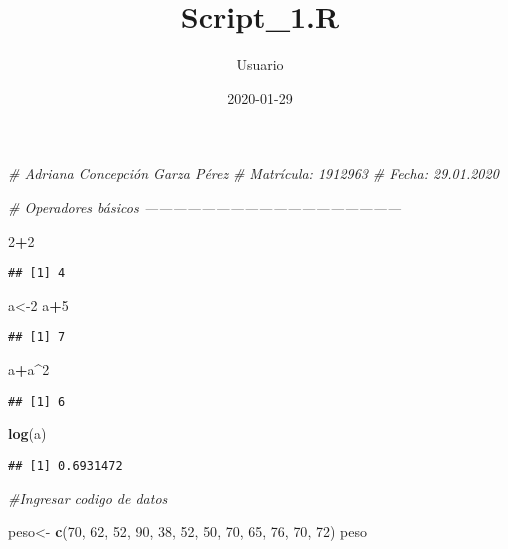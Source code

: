 \documentclass[
]{article}
\title{Script\_1.R}
\author{Usuario}
\date{2020-01-29}
\newenvironment{Shaded}{\begin{snugshade}}{\end{snugshade}}
\newcommand{\CommentTok}[1]{\textcolor[rgb]{0.56,0.35,0.01}{\textit{#1}}}
\newcommand{\DecValTok}[1]{\textcolor[rgb]{0.00,0.00,0.81}{#1}}
\newcommand{\KeywordTok}[1]{\textcolor[rgb]{0.13,0.29,0.53}{\textbf{#1}}}
\newcommand{\NormalTok}[1]{#1}
\newcommand{\OperatorTok}[1]{\textcolor[rgb]{0.81,0.36,0.00}{\textbf{#1}}}
\newcommand{\StringTok}[1]{\textcolor[rgb]{0.31,0.60,0.02}{#1}}
\begin{document}
\maketitle

\begin{Shaded}
\begin{Highlighting}[]
\CommentTok{# Adriana Concepción Garza Pérez}
\CommentTok{# Matrícula: 1912963}
\CommentTok{# Fecha: 29.01.2020}

\CommentTok{# Operadores básicos ------------------------------------------------------}

\DecValTok{2}\OperatorTok{+}\DecValTok{2}
\end{Highlighting}
\end{Shaded}

\begin{verbatim}
## [1] 4
\end{verbatim}

\begin{Shaded}
\begin{Highlighting}[]
\NormalTok{a<-}\DecValTok{2}
\NormalTok{a}\OperatorTok{+}\DecValTok{5}
\end{Highlighting}
\end{Shaded}

\begin{verbatim}
## [1] 7
\end{verbatim}

\begin{Shaded}
\begin{Highlighting}[]
\NormalTok{a}\OperatorTok{+}\NormalTok{a}\OperatorTok{^}\DecValTok{2}
\end{Highlighting}
\end{Shaded}

\begin{verbatim}
## [1] 6
\end{verbatim}

\begin{Shaded}
\begin{Highlighting}[]
\KeywordTok{log}\NormalTok{(a)}
\end{Highlighting}
\end{Shaded}

\begin{verbatim}
## [1] 0.6931472
\end{verbatim}

\begin{Shaded}
\begin{Highlighting}[]
\CommentTok{#Ingresar codigo de datos }

\NormalTok{peso<-}\StringTok{ }\KeywordTok{c}\NormalTok{(}\DecValTok{70}\NormalTok{, }\DecValTok{62}\NormalTok{, }\DecValTok{52}\NormalTok{, }\DecValTok{90}\NormalTok{, }\DecValTok{38}\NormalTok{, }\DecValTok{52}\NormalTok{, }\DecValTok{50}\NormalTok{, }\DecValTok{70}\NormalTok{, }\DecValTok{65}\NormalTok{,}
         \DecValTok{76}\NormalTok{, }\DecValTok{70}\NormalTok{, }\DecValTok{72}\NormalTok{)}
\NormalTok{peso}
\end{Highlighting}
\end{Shaded}
\end{document}
